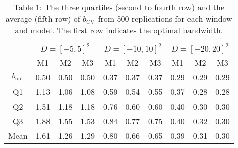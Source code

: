 \documentclass[12pt]{article}
\begin{document}
\begin{table}
	\caption*{Table 1: The three quartiles (second to fourth row) and the average (fifth row) of $b_\text{CV}$ from 500
		replications for each window and model. The first row indicates the optimal bandwidth.}
	\centering
	\begin{tabular}[t]{cccccccccc}
		\toprule
		\multicolumn{1}{c}{ } & \multicolumn{3}{c}{$D = [-5,5]^2$} & \multicolumn{3}{c}{$D = [-10,10]^2$} & \multicolumn{3}{c}{$D = [-20,20]^2$} \\
		\cmidrule(l{3pt}r{3pt}){2-4} \cmidrule(l{3pt}r{3pt}){5-7} \cmidrule(l{3pt}r{3pt}){8-10}
		& M1 & M2 & M3 & M1 & M2 & M3 & M1 & M2 & M3\\
		\midrule
		$b_\text{opt}$ & 0.50 & 0.50 & 0.50 & 0.37 & 0.37 & 0.37 & 0.29 & 0.29 & 0.29\\
		Q1 & 1.13 & 1.06 & 1.08 & 0.59 & 0.54 & 0.55 & 0.37 & 0.28 & 0.28\\
		Q2 & 1.51 & 1.18 & 1.18 & 0.76 & 0.60 & 0.60 & 0.40 & 0.30 & 0.30\\
		Q3 & 1.88 & 1.55 & 1.53 & 0.84 & 0.77 & 0.75 & 0.40 & 0.32 & 0.30\\
		Mean & 1.61 & 1.26 & 1.29 & 0.80 & 0.66 & 0.65 & 0.39 & 0.31 & 0.30\\
		\bottomrule
	\end{tabular}
\end{table}
\end{document}
